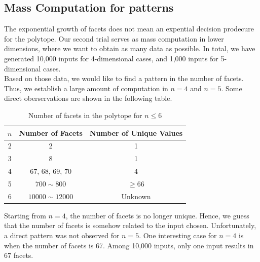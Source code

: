 \documentclass[12pt,letterpaper]{article}
\begin{document}
\subsection{Mass Computation for patterns}
The exponential growth of facets does not mean an expential decision prodecure for the polytope. 
Our second trial serves as mass computation in lower dimensions, where we want to obtain 
as many data as possible. In total, we have generated 10,000 inputs for 4-dimensional cases, 
and 1,000 inputs for 5-dimensional cases. \\
Based on those data, we would like to find a pattern in 
the number of facets. Thus, we establish a large amount of 
computation in $n = 4$ and $n = 5$. Some direct oberservations are shown in the following table. 
\begin{table}[ht]
    \centering
    \begin{tabular}{||c | c | c ||}
        \hline 
        $n$ & Number of Facets & Number of Unique Values\\
        \hline 
        \hline 
 2 & 2 & 1\\
        \hline 
 3 & 8 & 1\\
        \hline 
 4 & 67, 68, 69, 70 & 4\\
        \hline 
 5 & $700 \sim 800$ & $\geq 66$\\
        \hline 
 6 & $10000 \sim 12000$  & Unknown\\
        \hline 
    \end{tabular}
    \caption{Number of facets in the polytope for $n \leq 6$}
\end{table}
Starting from $n = 4$, the number of facets is no longer unique. 
Hence, we guess that the number of facets is somehow related to the input chosen. 
Unfortunately, a direct pattern was not observed for $n=5$.
One interesting case for $n = 4$ is when the number of facets is 67.
Among 10,000 inputs, only one input results in 67 facets. 
\end{document}
